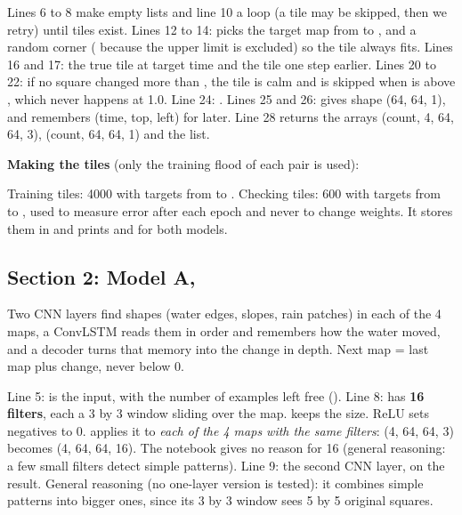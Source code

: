 
Lines 6 to 8 make empty lists and line 10 a  loop (a tile may be skipped, then we retry) until  tiles exist. Lines 12 to 14:  picks the target map from  to , and a random corner ( because the upper limit is excluded) so the tile always fits. Lines 16 and 17: the true tile at target time and the tile one step earlier. Lines 20 to 22: if no square changed more than , the tile is calm and is skipped when  is above , which never happens at 1.0. Line 24: . Lines 25 and 26:  gives shape (64, 64, 1), and  remembers (time, top, left) for later. Line 28 returns the arrays (count, 4, 64, 64, 3), (count, 64, 64, 1) and the list.

\textbf{Making the tiles} (only the training flood of each pair is used):

Training tiles: 4000 with targets from  to . Checking tiles: 600 with targets from  to , used to measure error after each epoch and never to change weights. It stores them in  and prints  and  for both models.


\subsection{Section 2: Model A, }

Two CNN layers find shapes (water edges, slopes, rain patches) in each of the 4 maps, a ConvLSTM reads them in order and remembers how the water moved, and a decoder turns that memory into the change in depth. Next map = last map plus change, never below 0.


Line 5:  is the input, with the number of examples left free (). Line 8:  has \textbf{16 filters}, each a 3 by 3 window sliding over the map.  keeps the size. ReLU sets negatives to 0.  applies it to \emph{each of the 4 maps with the same filters}: (4, 64, 64, 3) becomes (4, 64, 64, 16). The notebook gives no reason for 16 (general reasoning: a few small filters detect simple patterns). Line 9: the second CNN layer, on the result. General reasoning (no one-layer version is tested): it combines simple patterns into bigger ones, since its 3 by 3 window sees 5 by 5 original squares.

